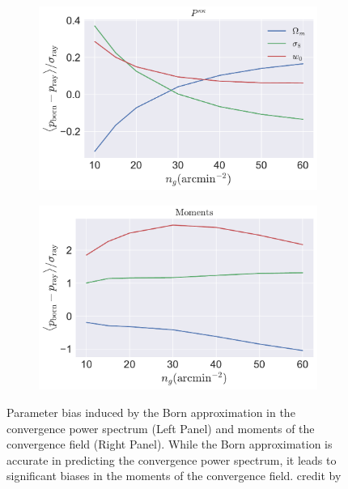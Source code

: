 \begin{figure}[ht]
    \centering
    \begin{subfigure}[b]{0.48\textwidth}
        \includegraphics[width=\textwidth]{figures/bias_ngal_convergence_powerSN_s0_nb100.pdf}
    \end{subfigure}
    \hfill
    \begin{subfigure}[b]{0.48\textwidth}
        \includegraphics[width=\textwidth]{figures/bias_ngal_convergence_momentsSN_s50_nb9.pdf}
    \end{subfigure}
    \caption[Parameter bias induced by the Born approximation]{Parameter bias induced by the Born approximation in the convergence power spectrum (Left Panel) and moments of the convergence field (Right Panel). While the Born approximation is accurate in predicting the convergence power spectrum, it leads to significant biases in the moments of the convergence field. credit by \citet{2017PhRvD..95l3503P}}
    \label{fig:born-approximation}
\end{figure}

